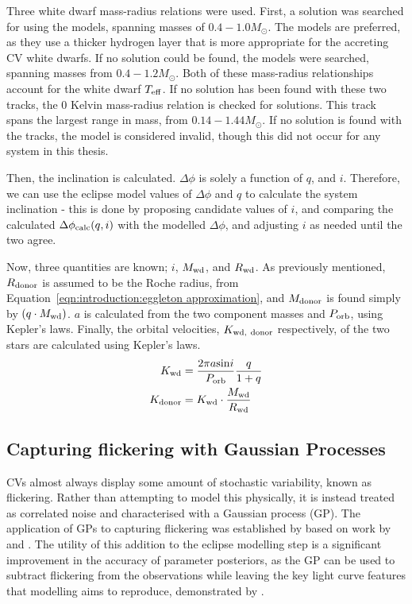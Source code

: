 Three white dwarf mass-radius relations were used. First, a solution was searched for using the \citet{wood1995} models, spanning masses of $0.4 - 1.0 M_\odot$. The \citet{wood1995} models are preferred, as they use a thicker hydrogen layer that is more appropriate for the accreting CV white dwarfs.
If no solution could be found, the \citet{panei2000} models were searched, spanning masses from $0.4 - 1.2 M_\odot$.
Both of these mass-radius relationships account for the white dwarf $T_{\rm eff}$.
If no solution has been found with these two tracks, the \citet{hamada1961} 0 Kelvin mass-radius relation is checked for solutions. This track spans the largest range in mass, from $0.14 - 1.44 M_\odot$. If no solution is found with the \citet{hamada1961} tracks, the model is considered invalid, though this did not occur for any system in this thesis.

Then, the inclination is calculated. $\Delta \phi$ is solely a function of $q$, and $i$. Therefore, we can use the eclipse model values of $\Delta\phi$ and $q$ to calculate the system inclination - this is done by proposing candidate values of $i$, and comparing the calculated $\Delta \phi_{\rm calc}(q,i)$ with the modelled $\Delta \phi$, and adjusting $i$ as needed until the two agree.

Now, three quantities are known; $i$, $M_{\rm wd}$, and $R_{\rm wd}$. As previously mentioned, $R_{\rm donor}$ is assumed to be the Roche radius, from Equation~\ref{eqn:introduction:eggleton approximation}, and $M_{\rm donor}$ is found simply by $(q \cdot M_{\rm wd})$. $a$ is calculated from the two component masses and $P_{\rm orb}$, using Kepler's laws. Finally, the orbital velocities, $K_{\rm wd,\ donor}$ respectively, of the two stars are calculated using Kepler's laws.
\begin{align}
    K_{\rm wd} &= \frac{2\pi a \mathrm{sin}i}{P_{\rm orb}} \frac{q}{1+q} \\
    K_{\rm donor} &= K_{\rm wd} \cdot \frac{M_{\rm wd}}{R_{\rm wd}}
\end{align}


\subsection{Capturing flickering with Gaussian Processes}

CVs almost always display some amount of stochastic variability, known as flickering. Rather than attempting to model this physically, it is instead treated as correlated noise and characterised with a Gaussian process (GP).
The application of GPs to capturing flickering was established by \citet{mcallister2017} based on work by \citet{roberts2012} and \citet{gibson2012}.
The utility of this addition to the eclipse modelling step is a significant improvement in the accuracy of parameter posteriors, as the GP can be used to subtract flickering from the observations while leaving the key light curve features that modelling aims to reproduce, demonstrated by \citet{mcallister2017}.

